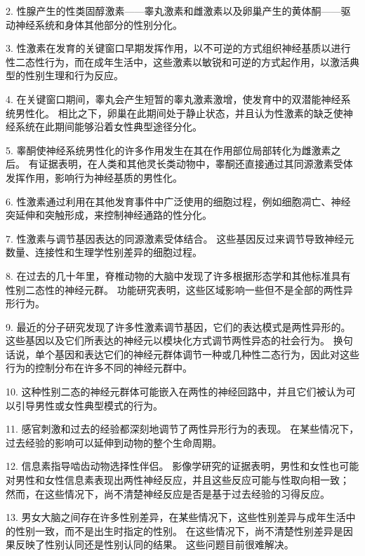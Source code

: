 2. 性腺产生的性类固醇激素——睾丸激素和雌激素以及卵巢产生的黄体酮——驱动神经系统和身体其他部分的性别分化。 

3. 性激素在发育的关键窗口早期发挥作用，以不可逆的方式组织神经基质以进行性二态性行为，而在成年生活中，这些激素以敏锐和可逆的方式起作用，以激活典型的性别生理和行为反应。 

4. 在关键窗口期间，睾丸会产生短暂的睾丸激素激增，使发育中的双潜能神经系统男性化。 相比之下，卵巢在此期间处于静止状态，并且认为性激素的缺乏使神经系统在此期间能够沿着女性典型途径分化。 

5. 睾酮使神经系统男性化的许多作用发生在其在作用部位局部转化为雌激素之后。 有证据表明，在人类和其他灵长类动物中，睾酮还直接通过其同源激素受体发挥作用，影响行为神经基质的男性化。 

6. 性激素通过利用在其他发育事件中广泛使用的细胞过程，例如细胞凋亡、神经突延伸和突触形成，来控制神经通路的性分化。 

7. 性激素与调节基因表达的同源激素受体结合。 这些基因反过来调节导致神经元数量、连接性和生理学性别差异的细胞过程。 

8. 在过去的几十年里，脊椎动物的大脑中发现了许多根据形态学和其他标准具有性别二态性的神经元群。 功能研究表明，这些区域影响一些但不是全部的两性异形行为。 

9. 最近的分子研究发现了许多性激素调节基因，它们的表达模式是两性异形的。 这些基因以及它们所表达的神经元以模块化方式调节两性异态的社会行为。 换句话说，单个基因和表达它们的神经元群体调节一种或几种性二态行为，因此对这些行为的控制分布在许多不同的神经元群中。 

10. 这种性别二态的神经元群体可能嵌入在两性的神经回路中，并且它们被认为可以引导男性或女性典型模式的行为。

11. 感官刺激和过去的经验都深刻地调节了两性异形行为的表现。 在某些情况下，过去经验的影响可以延伸到动物的整个生命周期。 

12. 信息素指导啮齿动物选择性伴侣。 影像学研究的证据表明，男性和女性也可能对男性和女性信息素表现出两性神经反应，并且这些反应可能与性取向相一致； 然而，在这些情况下，尚不清楚神经反应是否是基于过去经验的习得反应。 

13. 男女大脑之间存在许多性别差异，在某些情况下，这些性别差异与成年生活中的性别一致，而不是出生时指定的性别。 在这些情况下，尚不清楚性别差异是因果反映了性别认同还是性别认同的结果。 这些问题目前很难解决。

